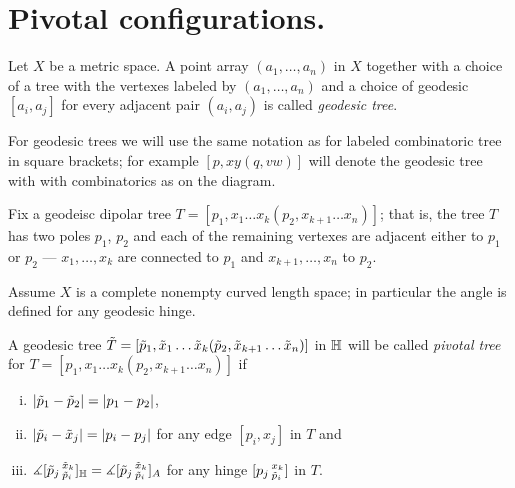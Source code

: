 \section{Pivotal configurations.}

Let $X$ be a metric space.
A point array $(a_1,\dots,a_n)$ in $X$ together with a choice of a tree with the vertexes labeled by  $(a_1,\dots,a_n)$ and a choice of geodesic $[a_i,a_j]$ for every adjacent pair $(a_i,a_j)$ is called \emph{geodesic tree}.

\hide
\begin{wrapfigure}{r}{15 mm}
\end{wrapfigure}
\unhide

For geodesic trees we will use the same notation as for labeled combinatoric tree in square brackets; for example $[p,xy(q,vw)]$ will denote the geodesic tree with with combinatorics as on the diagram. 



Fix a geodeisc dipolar tree $T=[p_1,x_1\dots x_k(p_2,x_{k+1}\dots x_n)]$;
that is, the tree $T$ has two poles $p_1$, $p_2$ and each of the remaining vertexes are adjacent either to $p_1$ or $p_2$ ---  $x_1,\dots, x_k$ are connected to $p_1$ and $x_{k+1},\dots, x_n$ to $p_2$.

Assume $X$ is a complete nonempty curved length space;
in particular the angle is defined for any geodesic hinge. 

A geodesic tree  $\~T=[\~p_1,\~x_1\dots \~x_k(\~p_2,\~x_{k+1}\dots \~x_n)]$ in $\HH$ will be called \emph{pivotal tree} for $T=[p_1,x_1\dots x_k(p_2,x_{k+1}\dots x_n)]$
if 
\begin{enumerate}[(i)]
\item $|\~p_1-\~p_2|= |p_1-p_2|$,
\item $|\~p_i-\~x_j|= |p_i-p_j|$ for any edge $[p_i,x_j]$ in $T$ and
\item $\measuredangle[\~p_j\,^{\~x_k}_{\~p_i}]_{\HH}=\measuredangle[\~p_j\,^{\~x_k}_{\~p_i}]_A$
for any hinge  $[p_j\,^{x_k}_{\~p_i}]$ in $T$.
\end{enumerate}

